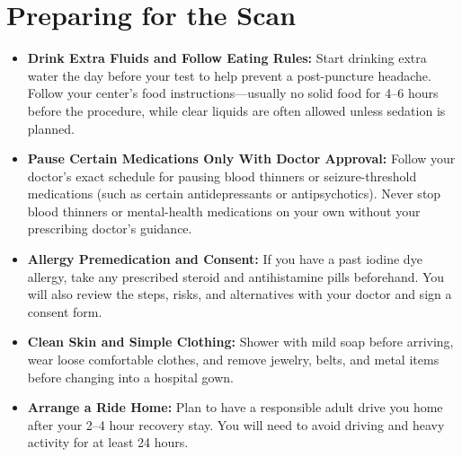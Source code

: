 \section{Preparing for the Scan}
\begin{itemize}
    \item \textbf{Drink Extra Fluids and Follow Eating Rules:} Start drinking extra water the day before your test to help prevent a post-puncture headache. Follow your center's food instructions---usually no solid food for 4--6 hours before the procedure, while clear liquids are often allowed unless sedation is planned.
    \item \textbf{Pause Certain Medications Only With Doctor Approval:} Follow your doctor's exact schedule for pausing blood thinners or seizure-threshold medications (such as certain antidepressants or antipsychotics). Never stop blood thinners or mental-health medications on your own without your prescribing doctor's guidance.
    \item \textbf{Allergy Premedication and Consent:} If you have a past iodine dye allergy, take any prescribed steroid and antihistamine pills beforehand. You will also review the steps, risks, and alternatives with your doctor and sign a consent form.
    \item \textbf{Clean Skin and Simple Clothing:} Shower with mild soap before arriving, wear loose comfortable clothes, and remove jewelry, belts, and metal items before changing into a hospital gown.
    \item \textbf{Arrange a Ride Home:} Plan to have a responsible adult drive you home after your 2--4 hour recovery stay. You will need to avoid driving and heavy activity for at least 24 hours.
\end{itemize}

